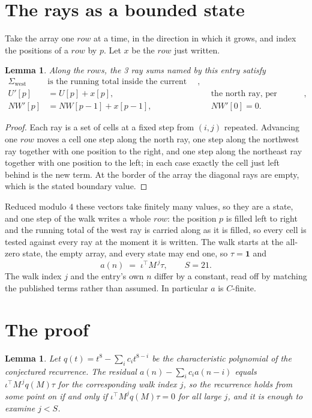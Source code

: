 \documentclass[11pt,a4paper]{article}
\theoremstyle{plain}
\newtheorem{lemma}[theorem]{Lemma}
\theoremstyle{definition}
\begin{document}
\section{The rays as a bounded state}

Take the array one $row$ at a time, in the direction in which it grows, and index the
positions of a $row $ by $p$. Let $x$ be the $row$ just written.

\begin{lemma}\label{lem:rays}
Along the $row$s, the 3 ray sums named by this entry satisfy
\[
\begin{aligned}
\Sigma_{\mathrm{west}}\ &\text{is the running total inside the current row},\\
U'[p]&=U[p]+x[p], &&\text{the north ray, per position},\\
NW'[p]&=NW[p-1]+x[p-1], && NW'[0]=0 .
\end{aligned}
\]
\end{lemma}

\begin{proof}
Each ray is a set of cells at a fixed step from $(i,j)$ repeated. Advancing one $row$
moves a cell one step along the north ray, one step along the northwest ray together with one
position to the right, and one step along the northeast ray together with one position to the
left; in each case exactly the cell just left behind is the new term. At the border of the
array the diagonal rays are empty, which is the stated boundary value.
\end{proof}

Reduced modulo $4$ these vectors take finitely many values, so they are a state, and one step
of the walk writes a whole $row$: the position $p$ is filled left to right and the
running total of the west ray is carried along as it is filled, so every cell is tested
against every ray at the moment it is written. The walk starts at the all-zero state, the empty
array, and every state may end one, so $\tau=\mathbf{1}$ and
\[
a(n)\;=\;\iota^{\!\top}M^{\,j}\tau ,\qquad S=21.
\]
The walk index $j$ and the entry's own $n$ differ by a constant, read off by matching the
published terms rather than assumed. In particular $a$ is $C$-finite.

\section{The proof}

\begin{lemma}\label{lem:crit}
Let $q(t)=t^{8}-\sum_i c_it^{8-i}$ be the characteristic polynomial of the
conjectured recurrence. The residual $a(n)-\sum_ic_ia(n-i)$ equals
$\iota^{\!\top}M^{\,j}q(M)\tau$ for the corresponding walk index $j$, so the recurrence
holds from some point on if and only if $\iota^{\!\top}M^{j}q(M)\tau=0$ for all large $j$,
and it is enough to examine $j<S$.
\end{lemma}
\end{document}
